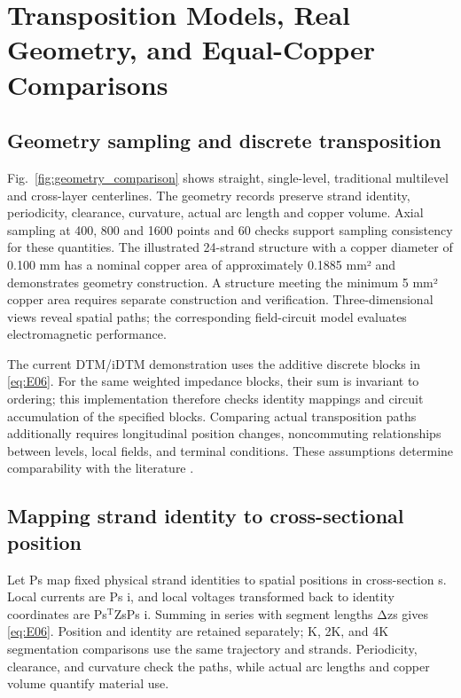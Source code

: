 \section{Transposition Models, Real Geometry, and Equal-Copper Comparisons}
\label{chapter:05}

\hypertarget{05.geometry.heading}{}
\subsection{Geometry sampling and discrete transposition}

\hypertarget{05.geometry.p1}{}
Fig.~\ref{fig:geometry_comparison} shows straight, single-level, traditional multilevel and cross-layer centerlines. The geometry records preserve strand identity, periodicity, clearance, curvature, actual arc length and copper volume. Axial sampling at 400, 800 and 1600 points and 60 checks support sampling consistency for these quantities. The illustrated 24-strand structure with a copper diameter of 0.100 mm has a nominal copper area of approximately 0.1885 mm² and demonstrates geometry construction. A structure meeting the minimum 5 mm² copper area requires separate construction and verification. Three-dimensional views reveal spatial paths; the corresponding field-circuit model evaluates electromagnetic performance.

\hypertarget{05.geometry.p2}{}
The current DTM/iDTM demonstration uses the additive discrete blocks in \eqref{eq:E06}. For the same weighted impedance blocks, their sum is invariant to ordering; this implementation therefore checks identity mappings and circuit accumulation of the specified blocks. Comparing actual transposition paths additionally requires longitudinal position changes, noncommuting relationships between levels, local fields, and terminal conditions. These assumptions determine comparability with the literature \cite{P01,N01}.

\hypertarget{05.dtm_derivation.heading}{}
\subsection{Mapping strand identity to cross-sectional position}

\hypertarget{05.dtm_derivation.p1}{}
Let Ps map fixed physical strand identities to spatial positions in cross-section s. Local currents are Ps i, and local voltages transformed back to identity coordinates are Ps\(^{\mathrm T}\)ZsPs i. Summing in series with segment lengths Δzs gives \eqref{eq:E06}. Position and identity are retained separately; K, 2K, and 4K segmentation comparisons use the same trajectory and strands. Periodicity, clearance, and curvature check the paths, while actual arc lengths and copper volume quantify material use.

